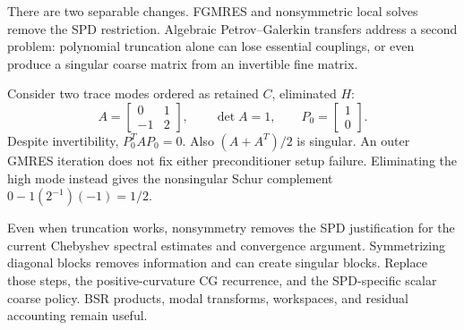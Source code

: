 \documentclass[11pt]{article}
\numberwithin{equation}{section}
\numberwithin{figure}{section}
\numberwithin{table}{section}
\begin{document}
There are two separable changes. FGMRES and nonsymmetric local solves remove
the SPD restriction. Algebraic Petrov--Galerkin transfers address a second
problem: polynomial truncation alone can lose essential couplings, or even
produce a singular coarse matrix from an invertible fine matrix.

Consider two trace modes ordered as retained $C$, eliminated $H$:
\[
 A=\begin{bmatrix}0&1\\-1&2\end{bmatrix},\qquad
 \det A=1,\qquad
 P_0=\begin{bmatrix}1\\0\end{bmatrix}.
\]
Despite invertibility, $P_0^TAP_0=0$. Also $(A+A^T)/2$ is singular.
An outer GMRES iteration does not fix either preconditioner setup failure.
Eliminating the high mode instead gives the nonsingular Schur complement
$0-1(2^{-1})(-1)=1/2$.

Even when truncation works, nonsymmetry removes the SPD justification for
the current Chebyshev spectral estimates and convergence argument.
Symmetrizing diagonal blocks removes information and can create singular
blocks. Replace those
steps, the positive-curvature CG recurrence, and the SPD-specific scalar
coarse policy. BSR products, modal transforms, workspaces, and residual
accounting remain useful.
\end{document}
